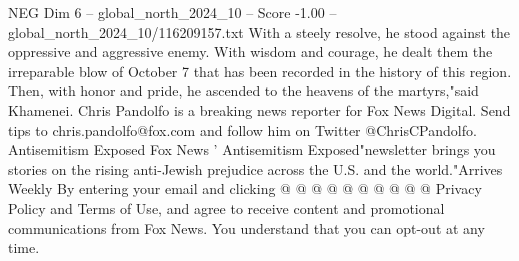 \begin{textsample}{NEG Dim 6 – global\_north\_2024\_10 – Score -1.00 – global\_north\_2024\_10/116209157.txt}
With a steely resolve, he stood against the oppressive and aggressive enemy.
With wisdom and courage, he dealt them the irreparable blow of October 7 that has been recorded in the history of this region.
Then, with honor and pride, he ascended to the heavens of the martyrs,"said Khamenei.
Chris Pandolfo is a breaking news reporter for Fox News Digital.
Send tips to chris.pandolfo@fox.com and follow him on Twitter @ChrisCPandolfo.
Antisemitism Exposed Fox News ' Antisemitism Exposed"newsletter brings you stories on the rising anti-Jewish prejudice across the U.S. and the world."Arrives Weekly By entering your email and clicking @ @ @ @ @ @ @ @ @ @ Privacy Policy and Terms of Use, and agree to receive content and promotional communications from Fox News.
You understand that you can opt-out at any time.

\end{textsample}
